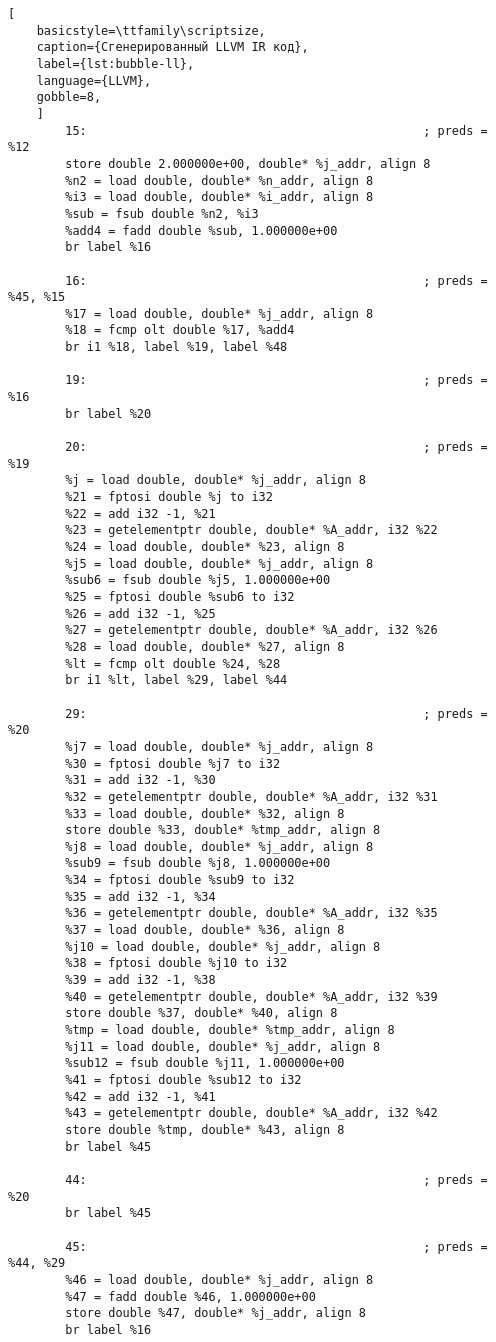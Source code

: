 \begin{lstlisting}[
	basicstyle=\ttfamily\scriptsize,
	caption={Сгенерированный LLVM IR код},
	label={lst:bubble-ll},
	language={LLVM},
	gobble=8,
	]
		15:                                               ; preds = %12
		store double 2.000000e+00, double* %j_addr, align 8
		%n2 = load double, double* %n_addr, align 8
		%i3 = load double, double* %i_addr, align 8
		%sub = fsub double %n2, %i3
		%add4 = fadd double %sub, 1.000000e+00
		br label %16

		16:                                               ; preds = %45, %15
		%17 = load double, double* %j_addr, align 8
		%18 = fcmp olt double %17, %add4
		br i1 %18, label %19, label %48

		19:                                               ; preds = %16
		br label %20

		20:                                               ; preds = %19
		%j = load double, double* %j_addr, align 8
		%21 = fptosi double %j to i32
		%22 = add i32 -1, %21
		%23 = getelementptr double, double* %A_addr, i32 %22
		%24 = load double, double* %23, align 8
		%j5 = load double, double* %j_addr, align 8
		%sub6 = fsub double %j5, 1.000000e+00
		%25 = fptosi double %sub6 to i32
		%26 = add i32 -1, %25
		%27 = getelementptr double, double* %A_addr, i32 %26
		%28 = load double, double* %27, align 8
		%lt = fcmp olt double %24, %28
		br i1 %lt, label %29, label %44

		29:                                               ; preds = %20
		%j7 = load double, double* %j_addr, align 8
		%30 = fptosi double %j7 to i32
		%31 = add i32 -1, %30
		%32 = getelementptr double, double* %A_addr, i32 %31
		%33 = load double, double* %32, align 8
		store double %33, double* %tmp_addr, align 8
		%j8 = load double, double* %j_addr, align 8
		%sub9 = fsub double %j8, 1.000000e+00
		%34 = fptosi double %sub9 to i32
		%35 = add i32 -1, %34
		%36 = getelementptr double, double* %A_addr, i32 %35
		%37 = load double, double* %36, align 8
		%j10 = load double, double* %j_addr, align 8
		%38 = fptosi double %j10 to i32
		%39 = add i32 -1, %38
		%40 = getelementptr double, double* %A_addr, i32 %39
		store double %37, double* %40, align 8
		%tmp = load double, double* %tmp_addr, align 8
		%j11 = load double, double* %j_addr, align 8
		%sub12 = fsub double %j11, 1.000000e+00
		%41 = fptosi double %sub12 to i32
		%42 = add i32 -1, %41
		%43 = getelementptr double, double* %A_addr, i32 %42
		store double %tmp, double* %43, align 8
		br label %45

		44:                                               ; preds = %20
		br label %45

		45:                                               ; preds = %44, %29
		%46 = load double, double* %j_addr, align 8
		%47 = fadd double %46, 1.000000e+00
		store double %47, double* %j_addr, align 8
		br label %16


\end{lstlisting}
